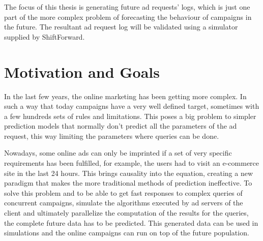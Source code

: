 The focus of this thesis is generating future ad requests' logs, which is just
one part of the more complex problem of
forecasting the behaviour of campaigns in the future. The resultant ad request log
will be validated using a simulator supplied by ShiftForward.




\section{Motivation and Goals} \label{sec:goals}

In the last few years, the online marketing has been getting more complex. In
such a way that today campaigns have a very well defined target, sometimes with
a few hundreds sets of rules and limitations. This poses a big problem to
simpler prediction models that normally don't predict all the parameters of the
ad request, this way limiting the parameters where queries can be done.


Nowadays, some online ads can only be imprinted if a set of very specific requirements has been fulfilled, for example,
the users had to visit an e-commerce site in the last 24 hours. This brings causality into the equation, creating a new paradigm that makes 
the more traditional methods of prediction ineffective. To solve this problem
and to be able to get fast responses to complex queries of concurrent campaigns,
simulate the algorithms executed by ad servers of the client
and ultimately parallelize the computation of the results for the
queries,
the complete future data has to be predicted. This generated data
can be used in simulations and the online campaigns can run on top of the future population.

